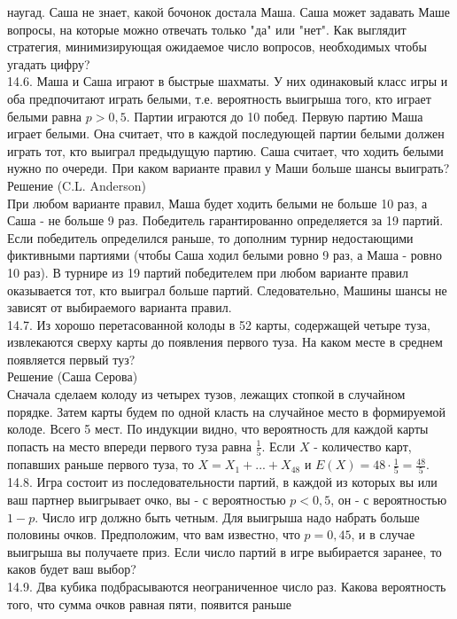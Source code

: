 \documentclass[pdftex,12pt,a4paper]{article}
\begin{document}
наугад. Саша не знает, какой бочонок достала Маша. Саша может
задавать Маше вопросы, на которые можно отвечать только "да" или
"нет". Как выглядит стратегия, минимизирующая ожидаемое число
вопросов, необходимых чтобы угадать цифру? \\
14.6. Маша и Саша играют в быстрые шахматы. У них одинаковый класс
игры и оба предпочитают играть белыми, т.е. вероятность выигрыша
того, кто играет белыми равна $p>0,5$. Партии играются до 10
побед. Первую партию Маша играет белыми. Она считает, что в каждой
последующей партии белыми должен играть тот, кто выиграл
предыдущую партию. Саша считает, что ходить белыми нужно по
очереди. При каком варианте правил у Маши больше шансы выиграть?
\\
Решение (C.L. Anderson) \\
При любом варианте правил, Маша будет ходить белыми не больше 10
раз, а Саша - не больше 9 раз. Победитель гарантированно
определяется за 19 партий. Если победитель определился раньше, то
дополним турнир недостающими фиктивными партиями (чтобы Саша ходил
белыми ровно 9 раз, а Маша - ровно 10 раз). В турнире из 19 партий
победителем при любом варианте правил оказывается тот, кто выиграл
больше партий. Следовательно, Машины шансы не зависят от
выбираемого варианта правил. \\
14.7. Из хорошо перетасованной колоды в 52 карты, содержащей
четыре туза, извлекаются сверху карты до появления первого туза.
На каком месте в среднем появляется первый туз? \\
Решение (Саша Серова)\\
Сначала сделаем колоду из четырех тузов, лежащих стопкой в
случайном порядке. Затем карты будем по одной класть на случайное
место в формируемой колоде. Всего 5 мест. По индукции видно, что
вероятность для каждой карты попасть на место впереди первого туза
равна $\frac{1}{5}$. Если $X$ - количество карт, попавших раньше
первого туза, то $X=X_{1}+...+X_{48}$ и
$E(X)=48\cdot\frac{1}{5}=\frac{48}{5}$. \\
14.8. Игра состоит из последовательности партий, в каждой из
которых вы или ваш партнер выигрывает очко, вы - с вероятностью
$p<0,5$, он - с вероятностью $1-p$. Число игр должно быть четным.
Для выигрыша надо набрать больше половины очков. Предположим, что
вам известно, что $p=0,45$, и в случае выигрыша вы получаете приз.
Если число партий в игре выбирается заранее, то каков будет ваш выбор? \\
14.9. Два кубика подбрасываются неограниченное число раз. Какова
вероятность того, что сумма очков равная пяти, появится раньше
\end{document}

